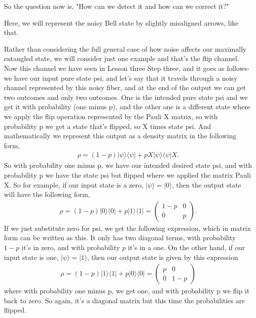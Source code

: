 So the question now is, "How can we detect it and how can we correct it?"

Here, we will represent the noisy Bell state by slightly misaligned arrows, like that.

Rather than considering the full general case of how noise affects our maximally entangled state, we will consider just one example and that's the flip channel. Now this channel we have seen in Lesson three Step three, and it goes as follows- we have our input pure state psi, and let's say that it travels through a noisy channel represented by this noisy fiber, and at the end of the output we can get two outcomes and only two outcomes. One is the intended pure state psi and we get it with probability (one minus p), and the other one is a different state where we apply the flip operation represented by the Pauli X matrix, so with probability p we get a state that's flipped, so X times state psi. And mathematically we represent this output as a density matrix in the following form,
\begin{align}
    \rho=(1-p)|\psi\rangle\langle\psi|+p X| \psi\rangle\langle\psi| X.
\end{align}
So with probability one minus p, we have our intended desired state psi, and with probability p we have the state psi but flipped where we applied the matrix Pauli X. So for example, if our input state is a zero, $|\psi\rangle=|0\rangle$,
then the output state will have the following form,
\begin{align}
    \rho=(1-p)|0\rangle\langle 0|+p| 1\rangle\langle 1|=\left(\begin{array}{cc}
1-p & 0 \\
0 & p
\end{array}\right).
\end{align}
If we just substitute zero for psi, we get the following expression, which in matrix form can be written as this. It only has two diagonal terms, with probability $1-p$ it's in zero, and with probability $p$ it's in a one. On the other hand, if our input state is one, $|\psi\rangle=|1\rangle$, then our output state is given by this expression
\begin{align}
    \rho=(1-p)|1\rangle\langle 1|+p| 0\rangle\langle 0|=\left(\begin{array}{cc}
p & 0 \\
0 & 1-p
\end{array}\right)
\end{align}
where with probability one minus p, we get one, and with probability p we flip it back to zero. So again, it's a diagonal matrix but this time the probabilities are flipped.

